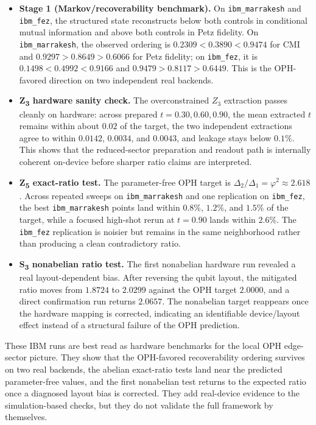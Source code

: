 \begin{itemize}
\tightlist
\item
  \textbf{Stage 1 (Markov/recoverability benchmark).} On \texttt{ibm\_marrakesh} and \texttt{ibm\_fez}, the structured state reconstructs below both controls in conditional mutual information and above both controls in Petz fidelity. On \texttt{ibm\_marrakesh}, the observed ordering is \(0.2309 < 0.3890 < 0.9474\) for CMI and \(0.9297 > 0.8649 > 0.6066\) for Petz fidelity; on \texttt{ibm\_fez}, it is \(0.1498 < 0.4992 < 0.9166\) and \(0.9479 > 0.8117 > 0.6449\). This is the OPH-favored direction on two independent real backends.
\item
  \textbf{Z\textsubscript{3} hardware sanity check.} The overconstrained \(Z_3\) extraction passes cleanly on hardware: across prepared \(t = 0.30, 0.60, 0.90\), the mean extracted \(t\) remains within about \(0.02\) of the target, the two independent extractions agree to within \(0.0142\), \(0.0034\), and \(0.0043\), and leakage stays below \(0.1\%\). This shows that the reduced-sector preparation and readout path is internally coherent on-device before sharper ratio claims are interpreted.
\item
  \textbf{Z\textsubscript{5} exact-ratio test.} The parameter-free OPH target is \(\Delta_2/\Delta_1 = \varphi^2 \approx 2.618\). Across repeated sweeps on \texttt{ibm\_marrakesh} and one replication on \texttt{ibm\_fez}, the best \texttt{ibm\_marrakesh} points land within \(0.8\%\), \(1.2\%\), and \(1.5\%\) of the target, while a focused high-shot rerun at \(t = 0.90\) lands within \(2.6\%\). The \texttt{ibm\_fez} replication is noisier but remains in the same neighborhood rather than producing a clean contradictory ratio.
\item
  \textbf{S\textsubscript{3} nonabelian ratio test.} The first nonabelian hardware run revealed a real layout-dependent bias. After reversing the qubit layout, the mitigated ratio moves from \(1.8724\) to \(2.0299\) against the OPH target \(2.0000\), and a direct confirmation run returns \(2.0657\). The nonabelian target reappears once the hardware mapping is corrected, indicating an identifiable device/layout effect instead of a structural failure of the OPH prediction.
\end{itemize}

These IBM runs are best read as hardware benchmarks for the local OPH edge-sector picture. They show that the OPH-favored recoverability ordering survives on two real backends, the abelian exact-ratio tests land near the predicted parameter-free values, and the first nonabelian test returns to the expected ratio once a diagnosed layout bias is corrected. They add real-device evidence to the simulation-based checks, but they do not validate the full framework by themselves.

